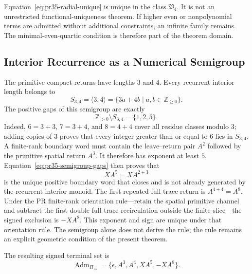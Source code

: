 Equation~\eqref{eq:pr35-radial-unique} is unique in the class \(\mathfrak V_4\).  It is not an unrestricted functional-uniqueness theorem. If higher even or nonpolynomial terms are admitted without additional constraints, an infinite family remains.  The minimal-even-quartic condition is therefore part of the theorem domain.

\subsection{Interior Recurrence as a Numerical Semigroup}
\label{subsec:pr35-compact-semigroup}

The primitive compact returns have lengths $3$ and $4$.  Every recurrent
interior length belongs to
\begin{equation}
S_{3,4}
=
\langle3,4\rangle
=
\{3a+4b\mid a,b\in\mathbb Z_{\ge0}\}.
\label{eq:pr35-semigroup}
\end{equation}
The positive gaps of this semigroup are exactly
\begin{equation}
\mathbb Z_{>0}\setminus S_{3,4}
=
\{1,2,5\}.
\label{eq:pr35-semigroup-gaps}
\end{equation}
Indeed, $6=3+3$, $7=3+4$, and $8=4+4$ cover all residue classes modulo $3$; adding copies of $3$ proves that every integer greater than or equal to $6$ lies in $S_{3,4}$. A finite-rank boundary word must contain the leave--return pair $A^2$ followed by the primitive spatial return $A^3$.  It therefore has exponent at least $5$.  Equation~\eqref{eq:pr35-semigroup-gaps} then proves that
\begin{equation}
XA^5=XA^{2+3}
\label{eq:pr35-unique-positive-terminal}
\end{equation}
is the unique positive boundary word that closes and is not already generated by the recurrent interior monoid. The first repeated full-trace return is $A^{4+4}=A^8$.  Under the PR finite-rank orientation rule---retain the spatial primitive channel and
subtract the first double full-trace recirculation outside the finite slice---the signed exclusion is $-XA^8$.  This exponent and sign are unique under that orientation rule.  The semigroup alone does not derive the rule; the rule remains an explicit geometric condition of the present theorem.

The resulting signed terminal set is
\begin{equation}
\boxed{
\operatorname{Adm}_{\Pi_{13}}
=
\{\epsilon,A^3,A^4,XA^5,-XA^8\}.}
\label{eq:pr35-signed-terminal-set}
\end{equation}

